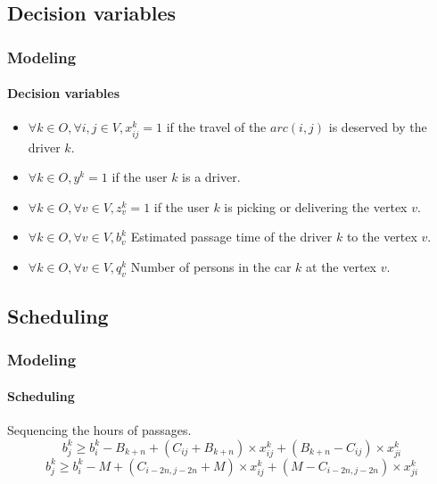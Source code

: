 \documentclass{beamer}
\begin{document}
	\subsection{Decision variables}
	\begin{frame}
		\frametitle{Modeling}
		\framesubtitle{Decision variables}
		\begin{itemize}
		\item $\forall k\in O, \forall i, j\in V, x^{k}_{ij}=1$ if the travel of the $arc(i, j)$ is deserved by the driver $k$. \\
		\item $\forall k\in O, y^{k}=1$ if the user $k$ is a driver. \\
		\item $\forall k\in O, \forall v\in V, z^{k}_{v}=1$ if the user $k$ is picking or delivering the vertex $v$. \\
		\item $\forall k\in O, \forall v\in V, b^{k}_{v}$ Estimated passage time of the driver $k$ to the vertex $v$. \\
		\item $\forall k\in O, \forall v\in V, q^{k}_{v}$ Number of persons in the car $k$ at the vertex $v$. \\
		\end{itemize}
	\end{frame}
	\subsection{Scheduling}
	\begin{frame}
		\frametitle{Modeling}
		\framesubtitle{Scheduling}
		Sequencing the hours of passages.
	\[ b^{k}_{j}\geq b^{k}_{i}-B_{k+n}+(C_{ij}+B_{k+n})\times x^{k}_{ij}+(B_{k+n}-C_{ij})\times x^{k}_{ji} \]
	\[ b^{k}_{j}\geq b^{k}_{i}-M+(C_{i-2n, j-2n}+M)\times x^{k}_{ij}+(M-C_{i-2n, j-2n})\times x^{k}_{ji} \]
	\end{frame}
\end{document}
